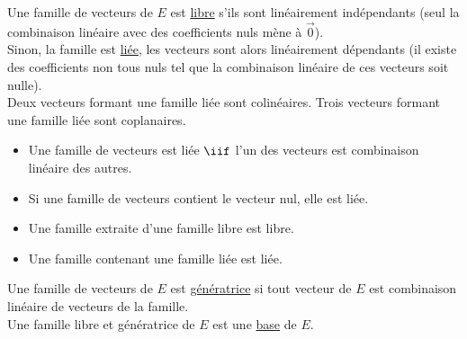   Une famille de vecteurs de $E$ est \underline{libre} s'ils sont linéairement indépendants (seul la combinaison linéaire avec des coefficients nuls mène à $\vec 0$).\\
  
  Sinon, la famille est \underline{liée}, les vecteurs sont alors linéairement dépendants (il existe des coefficients non tous nuls tel que la combinaison linéaire de ces vecteurs soit nulle).\\
  
  Deux vecteurs formant une famille liée sont colinéaires.
  Trois vecteurs formant une famille liée sont coplanaires.\\
  
  \begin{itemize}
    \item Une famille de vecteurs est liée $\iif$ l'un des vecteurs est combinaison linéaire des autres.
    \item Si une famille de vecteurs contient le vecteur nul, elle est liée.
    \item Une famille extraite d'une famille libre est libre.
    \item Une famille contenant une famille liée est liée.\\
  \end{itemize}
  
  Une famille de vecteurs de $E$ est \underline{génératrice} si tout vecteur de $E$ est combinaison linéaire de vecteurs de la famille.\\
  Une famille libre et génératrice de $E$ est une \underline{base} de $E$.\\
  
  
  